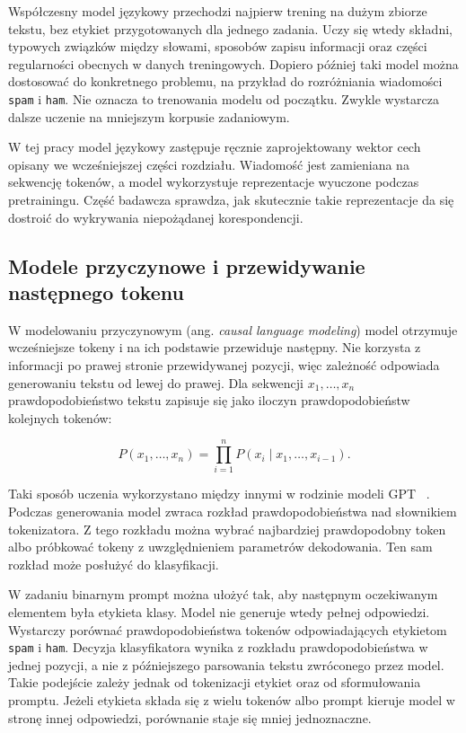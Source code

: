 Współczesny model językowy przechodzi najpierw trening na dużym
zbiorze tekstu, bez etykiet przygotowanych dla jednego zadania. Uczy się wtedy
składni, typowych związków między słowami, sposobów zapisu informacji oraz
części regularności obecnych w danych treningowych. Dopiero później taki model
można dostosować do konkretnego problemu, na przykład do rozróżniania wiadomości
\texttt{spam} i \texttt{ham}. Nie oznacza to trenowania modelu od początku.
Zwykle wystarcza dalsze uczenie na mniejszym korpusie zadaniowym.

W tej pracy model językowy zastępuje ręcznie zaprojektowany wektor cech opisany
we wcześniejszej części rozdziału. Wiadomość jest zamieniana na sekwencję
tokenów, a model wykorzystuje reprezentacje wyuczone podczas pretrainingu.
Część badawcza sprawdza, jak skutecznie takie reprezentacje da się dostroić do wykrywania
niepożądanej korespondencji.

\subsection{Modele przyczynowe i przewidywanie następnego tokenu}

W modelowaniu przyczynowym (ang. \emph{causal language modeling}) model otrzymuje
wcześniejsze tokeny i na ich podstawie przewiduje następny. Nie korzysta z
informacji po prawej stronie przewidywanej pozycji, więc zależność odpowiada
generowaniu tekstu od lewej do prawej. Dla sekwencji \(x_1, \ldots, x_n\)
prawdopodobieństwo tekstu zapisuje się jako iloczyn prawdopodobieństw kolejnych
tokenów:

\[
P(x_1, \ldots, x_n) =
\prod_{i=1}^{n} P(x_i \mid x_1, \ldots, x_{i-1}).
\]

Taki sposób uczenia wykorzystano między innymi w rodzinie modeli GPT
~\autocite{radford-gpt2-2019,brown-language-models-few-shot}. Podczas generowania
model zwraca rozkład prawdopodobieństwa nad słownikiem tokenizatora. Z tego
rozkładu można wybrać najbardziej prawdopodobny token albo próbkować tokeny z
uwzględnieniem parametrów dekodowania. Ten sam rozkład może posłużyć do
klasyfikacji.

W zadaniu binarnym prompt można ułożyć tak, aby następnym oczekiwanym elementem
była etykieta klasy. Model nie generuje wtedy pełnej odpowiedzi. Wystarczy
porównać prawdopodobieństwa tokenów odpowiadających etykietom \texttt{spam} i
\texttt{ham}. Decyzja klasyfikatora wynika z rozkładu prawdopodobieństwa w
jednej pozycji, a nie z późniejszego parsowania tekstu zwróconego przez model.
Takie podejście zależy jednak od tokenizacji etykiet oraz od sformułowania
promptu. Jeżeli etykieta składa się z wielu tokenów albo prompt kieruje model w
stronę innej odpowiedzi, porównanie staje się mniej jednoznaczne.

